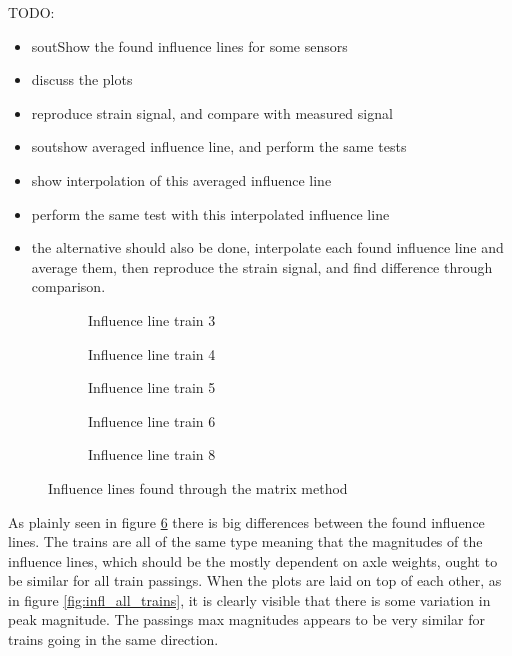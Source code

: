 TODO:
\begin{itemize}
\item sout{Show the found influence lines for some sensors}
\item discuss the plots
\item reproduce strain signal, and compare with measured signal
\item sout{show averaged influence line}, and perform the same tests
\item show interpolation of this averaged influence line
\item perform the same test with this interpolated influence line
\item the alternative should also be done, interpolate each found influence line and average them, then reproduce the strain signal, and find difference through comparison.
\end{itemize}


\begin{figure}[H]
\centering
\begin{subfigure}[t]{0.4\textwidth}
	\centering
	
	\caption{Influence line train 3}
	\label{fig:train3}
\end{subfigure}
\qquad
\begin{subfigure}[t]{0.4\textwidth}
	\centering
	
	\caption{Influence line train 4}
	\label{fig:train4}
\end{subfigure}

\begin{subfigure}[t]{0.4\textwidth}
	\centering
	
	\caption{Influence line train 5}
	\label{fig:train5}
\end{subfigure}
\qquad
\begin{subfigure}[t]{0.4\textwidth}
	\centering
	
	\caption{Influence line train 6}
	\label{fig:train6}
\end{subfigure}

\begin{subfigure}[t]{0.9\textwidth}
	\centering
	
	\caption{Influence line train 8}
	\label{fig:train8}
\end{subfigure}
\caption{Influence lines found through the matrix method}
\label{fig:Influence_lines}
\end{figure}

As plainly seen in figure \ref{fig:Influence_lines} there is big differences between the found influence lines. The trains are all of the same type meaning that the magnitudes of the influence lines, which should be the mostly dependent on axle weights, ought to be similar for all train passings.  When the plots are laid on top of each other, as in figure \ref{fig:infl_all_trains}, it is clearly visible that there is some variation in peak magnitude. The passings max magnitudes appears to be very similar for trains going in the same direction.
